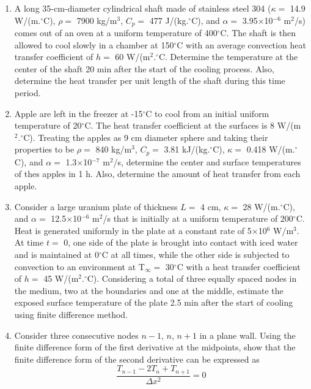 \documentclass[12pts,a4paper,amsmath,amssymb,floatfix]{article}%
\newcommand{\frc}{\displaystyle\frac}
\begin{document}
\begin{enumerate}[label=\bfseries Problem \arabic*:]
\item\label{Problem:Analytical_Cylinder} A long 35-cm-diameter cylindrical shaft made of stainless steel 304 ($\kappa=$ 14.9 W/(m.$^{\circ}$C), $\rho=$ 7900 kg/m$^{3}$, $C_{p}=$ 477 J/(kg.$^{\circ}$C), and $\alpha=$ 3.95$\times$10$^{-6}$ m$^{2}$/s) comes out of an oven at a uniform temperature of 400$^{\circ}$C. The shaft is then allowed to cool slowly in a chamber at 150$^{\circ}$C with an average convection heat transfer coefficient of $h=$ 60 W/(m$^{2}.^{\circ}$C. Determine the temperature at the center of the shaft 20 min after the start of the cooling process. Also, determine the heat transfer per unit length of the shaft during this time period.

\item\label{Problem:Analytical_Sphere}  Apple are left in the freezer at -15$^{\circ}$C to cool from an initial uniform temperature of 20$^{\circ}$C. The heat transfer coefficient at the surfaces is 8 W/(m$^{2}.^{\circ}$C). Treating the apples as 9 cm diameter sphere and taking their properties to be $\rho=$  840 kg/m$^{3}$, $C_{p}=$ 3.81 kJ/(kg.$^{\circ}$C), $\kappa=$ 0.418 W/(m.$^{\circ}$C), and  $\alpha=$ 1.3$\times$10$^{-7}$ m$^{2}$/s, determine the center and surface temperatures of thes apples in 1 h. Also, determine the amount of heat transfer from each apple.


\item\label{Problem:FDM_Plate} Consider a large uranium plate of thickness $L=$ 4 cm, $\kappa =$ 28 W/(m.$^{\circ}$C), and $\alpha =$ 12.5$\times$10$^{-6}$ m$^{2}$/s that is initially at a uniform temperature of 200$^{\circ}$C. Heat is generated uniformly in the plate at a constant rate of 5$\times$10$^{6}$ W/m$^{3}$. At time $t=$ 0, one side of the plate is brought into contact with iced water and is maintained at 0$^{\circ}$C at all times, while the other side is subjected to convection to an environment at T$_{\infty}=$ 30$^{\circ}$C with a heat transfer coefficient of $h=$ 45 W/(m$^{2}.^{\circ}$C). Considering a total of three equally spaced nodes in the medium, two at the boundaries and one at the middle, estimate the exposed surface temperature of the plate 2.5 min after the start of cooling using finite difference method.

\item\label{Problem:FDM_Derivation} Consider three consecutive nodes $n-1$, $n$, $n+1$ in a plane wall. Using the finite difference form of the first derivative at the midpoints, show that the finite difference form of  the second derivative can be expressed as
\begin{displaymath}
  \frc{T_{n-1}-2T_{n}+T_{n+1}}{\Delta x^{2}} = 0
\end{displaymath}


\end{enumerate}
\end{document}
